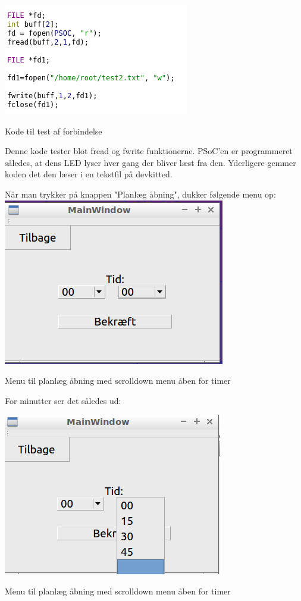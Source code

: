 \includegraphics{Billeder/testKode}
\caption{Kode til test af forbindelse}

Denne kode tester blot fread og fwrite funktionerne. PSoC'en er programmeret således, at dens LED lyser hver gang der bliver læst fra den. Yderligere gemmer koden det den læser i en tekstfil på devkitted.

Når man trykker på knappen "Planlæg åbning", dukker følgende menu op:
\includegraphics{Billeder/paMin}
\caption{Menu til planlæg åbning med scrolldown menu åben for timer}

For minutter ser det således ud:

\includegraphics{Billeder/paMinutter}
\caption{Menu til planlæg åbning med scrolldown menu åben for timer}

